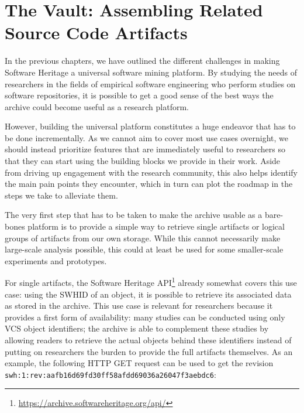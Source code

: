 \chapter{The Vault: Assembling Related Source Code Artifacts}%
\label{chp:vault}

In the previous chapters, we have outlined the different challenges in making
Software Heritage a universal software mining platform. By studying the needs
of researchers in the fields of empirical software engineering who perform
studies on software repositories, it is possible to get a good sense of the
best ways the archive could become useful as a research platform.

However, building the universal platform constitutes a huge endeavor that has
to be done incrementally. As we cannot aim to cover most use cases overnight,
we should instead prioritize features that are immediately useful to
researchers so that they can start using the building blocks we provide in
their work. Aside from driving up engagement with the research community, this
also helps identify the main pain points they encounter, which in turn can
plot the roadmap in the steps we take to alleviate them.

The very first step that has to be taken to make the archive usable as a
bare-bones platform is to provide a simple way to retrieve single artifacts or
logical groups of artifacts from our own storage. While this cannot necessarily
make large-scale analysis possible, this could at least be used for some
smaller-scale experiments and prototypes.

For single artifacts, the Software Heritage
API\footnote{\url{https://archive.softwareheritage.org/api/}} already somewhat
covers this use case: using the \gls{SWHID} of an object, it is possible to
retrieve its associated data as stored in the archive. This use case is
relevant for researchers because it provides a first form of availability: many
studies can be conducted using only \gls{VCS} object identifiers; the archive
is able to complement these studies by allowing readers to retrieve the actual
objects behind these identifiers instead of putting on researchers the burden
to provide the full artifacts themselves.
As an example, the following HTTP GET request can be used to get the revision
\texttt{swh:1:rev:aafb16d69fd30ff58afdd69036a26047f3aebdc6}:

\vspace{1em}

